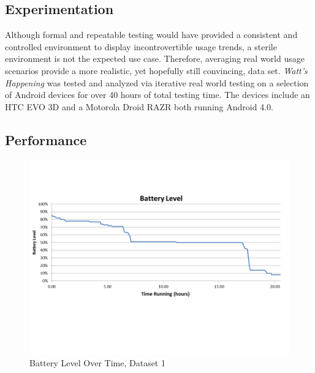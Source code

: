 \subsection{Experimentation}
Although formal and repeatable testing would have provided a consistent and controlled environment to display incontrovertible usage trends, a sterile environment is not the expected use case.
Therefore, averaging real world usage scenarios provide a more realistic, yet hopefully still convincing, data set.
\emph{Watt's Happening} was tested and analyzed via iterative real world testing on a selection of Android devices for over 40 hours of total testing time.
The devices include an HTC EVO 3D and a Motorola Droid RAZR both running Android 4.0. 

\subsection{Performance}
\begin{figure}[h]
	\begin{center}
		\includegraphics[scale=0.5]{figs/battery_level.png}
		\caption{Battery Level Over Time, Dataset 1}
		\label{fig:bat_level}
\end{center}
\end{figure}
